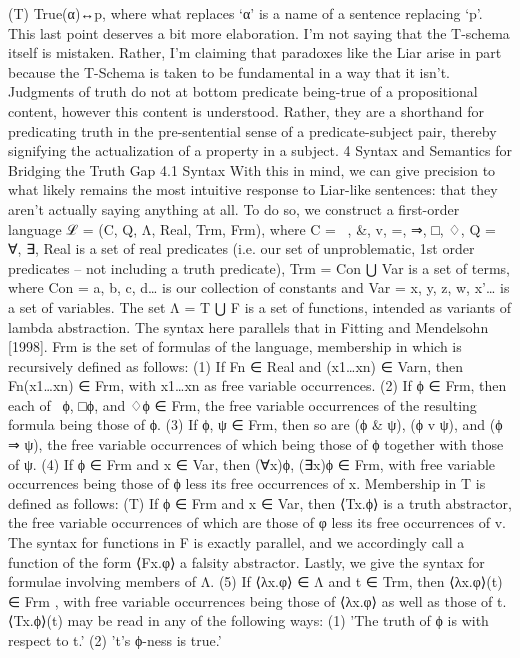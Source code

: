 \documentclass[]{article}
\begin{document}
(T) 	True(α)↔p,		where what replaces ‘α’ is a name of a sentence replacing ‘p’.
This last point deserves a bit more elaboration. I’m not saying that the T-schema itself is mistaken. Rather, I’m claiming that paradoxes like the Liar arise in part because the T-Schema is taken to be fundamental in a way that it isn’t. Judgments of truth do not at bottom predicate being-true of a propositional content, however this content is understood. Rather, they are a shorthand for predicating truth in the pre-sentential sense of a predicate-subject pair, thereby signifying the actualization of a property in a subject. 
4 Syntax and Semantics for Bridging the Truth Gap
4.1 Syntax
With this in mind, we can give precision to what likely remains the most intuitive response to Liar-like sentences: that they aren’t actually saying anything at all. To do so, we construct a first-order language ℒ = (C, Q, Λ, Real, Trm, Frm), where C = {~, &, v, =, ⇒, □, ♢}, Q = {∀, ∃}, Real is a set of real predicates (i.e. our set of unproblematic, 1st order predicates – not including a truth predicate), Trm = Con ⋃ Var is a set of terms, where Con = {a, b, c, d…} is our collection of constants and Var = {x, y, z, w, x'…} is a set of variables. The set Λ = T ⋃ F is a set of functions, intended as variants of lambda abstraction. The syntax here parallels that in Fitting and Mendelsohn [1998]. Frm is the set of formulas of the language, membership in which is recursively defined as follows: 
(1)	If Fn ∈ Real and (x1…xn) ∈ Varn, then Fn(x1…xn) ∈ Frm, with x1…xn as free variable occurrences. 
(2)	If ϕ ∈ Frm, then each of ~ϕ, □ϕ, and ♢ϕ ∈ Frm, the free variable occurrences of the resulting formula being those of ϕ. 
(3)	If ϕ, ψ ∈ Frm, then so are (ϕ & ψ), (ϕ v ψ), and (ϕ ⇒ ψ), the free variable occurrences of which being those of ϕ together with those of ψ. 
(4)	If ϕ ∈ Frm and x ∈ Var, then (∀x)ϕ, (∃x)ϕ ∈ Frm, with free variable occurrences being those of ϕ less its free occurrences of x.
Membership in T is defined as follows:
(T)	If ϕ ∈ Frm and x ∈ Var, then ⟨Tx.ϕ⟩ is a truth abstractor, the free variable occurrences of which are those of φ less its free occurrences of v.
The syntax for functions in F is exactly parallel, and we accordingly call a function of the form ⟨Fx.φ⟩ a falsity abstractor. 
Lastly, we give the syntax for formulae involving members of Λ. 
(5)	If ⟨λx.φ⟩ ∈ Λ and t ∈ Trm, then ⟨λx.φ⟩(t) ∈ Frm , with free variable occurrences being those of ⟨λx.φ⟩ as well as those of t.
⟨Tx.ϕ⟩(t) may be read in any of the following ways:
(1)	'The truth of ϕ is with respect to t.'
(2)	't's ϕ-ness is true.'
\end{document}
